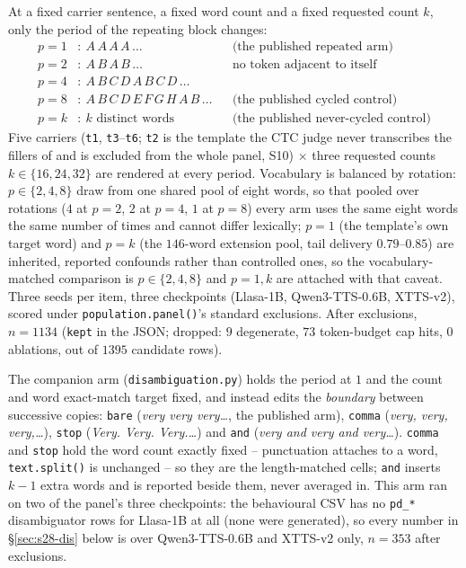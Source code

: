 \documentclass[11pt]{article}
\begin{document}
At a fixed carrier sentence, a fixed word count and a fixed requested count
$k$, only the period of the repeating block changes:
\[
\begin{aligned}
p=1&:\ A\,A\,A\,A\,\dots &&\text{(the published repeated arm)}\\
p=2&:\ A\,B\,A\,B\,\dots &&\text{no token adjacent to itself}\\
p=4&:\ A\,B\,C\,D\,A\,B\,C\,D\,\dots\\
p=8&:\ A\,B\,C\,D\,E\,F\,G\,H\,A\,B\,\dots &&\text{(the published cycled control)}\\
p=k&:\ k\text{ distinct words} &&\text{(the published never-cycled control)}
\end{aligned}
\]
Five carriers (\texttt{t1}, \texttt{t3}--\texttt{t6}; \texttt{t2} is the
template the CTC judge never transcribes the fillers of and is excluded from
the whole panel, S10) $\times$ three requested counts $k\in\{16,24,32\}$ are
rendered at every period. Vocabulary is balanced by rotation: $p\in\{2,4,8\}$
draw from one shared pool of eight words, so that pooled over rotations
($4$ at $p{=}2$, $2$ at $p{=}4$, $1$ at $p{=}8$) every arm uses the same
eight words the same number of times and cannot differ lexically; $p=1$ (the
template's own target word) and $p=k$ (the $146$-word extension pool, tail
delivery $0.79$--$0.85$) are inherited, reported confounds rather than
controlled ones, so the vocabulary-matched comparison is $p\in\{2,4,8\}$ and
$p=1,k$ are attached with that caveat. Three seeds per item, three
checkpoints (Llasa-1B, Qwen3-TTS-0.6B, XTTS-v2), scored under
\texttt{population.panel()}'s standard exclusions. After exclusions, $n=1134$
(\texttt{kept} in the JSON; dropped: $9$ degenerate, $73$ token-budget cap
hits, $0$ ablations, out of $1395$ candidate rows).

The companion arm (\texttt{disambiguation.py}) holds the period at $1$ and
the count and word exact-match target fixed, and instead edits the
\emph{boundary} between successive copies: \texttt{bare} (\emph{very very
very\ldots}, the published arm), \texttt{comma} (\emph{very, very,
very,\ldots}), \texttt{stop} (\emph{Very. Very. Very.\ldots}) and \texttt{and}
(\emph{very and very and very\ldots}). \texttt{comma} and \texttt{stop} hold
the word count exactly fixed -- punctuation attaches to a word,
\texttt{text.split()} is unchanged -- so they are the length-matched cells;
\texttt{and} inserts $k-1$ extra words and is reported beside them, never
averaged in. This arm ran on two of the panel's three checkpoints: the
behavioural CSV has no \texttt{pd\_*} disambiguator rows for Llasa-1B at all
(none were generated), so every number in \S\ref{sec:s28-dis} below is over
Qwen3-TTS-0.6B and XTTS-v2 only, $n=353$ after exclusions.
\end{document}
